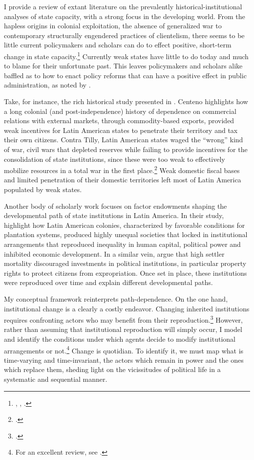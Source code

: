 \documentclass[12pt,]{book}
\let\rmarkdownfootnote\footnote%
\def\footnote{\protect\rmarkdownfootnote}
\begin{document}
I provide a review of extant literature on the prevalently historical-institutional analyses of state capacity, with a strong focus in the developing world. From the hapless origins in colonial exploitation, the absence of generalized war to contemporary structurally engendered practices of clientelism, there seems to be little current policymakers and scholars can do to effect positive, short-term change in state capacity.\footnote{\citet{acemoglu_colonial_2001}, \citet{engerman_factor_1997}, \citet{centeno_blood_1997}.} Currently weak states have little to do today and much to blame for their unfortunate past. This leaves policymakers and scholars alike baffled as to how to enact policy reforms that can have a positive effect in public administration, as noted by \citet{grindle_good_2004}.

Take, for instance, the rich historical study presented in \citet{centeno_blood_1997}. Centeno highlights how a long colonial (and post-independence) history of dependence on commercial relations with external markets, through commodity-based exports, provided weak incentives for Latin American states to penetrate their territory and tax their own citizens. Contra Tilly, Latin American states waged the ``wrong'' kind of war, civil wars that depleted reserves while failing to provide incentives for the consolidation of state institutions, since these were too weak to effectively mobilize resources in a total war in the first place.\footnote{\citet{tilly_coercion_1992}.} Weak domestic fiscal bases and limited penetration of their domestic territories left most of Latin America populated by weak states.

Another body of scholarly work focuses on factor endowments shaping the developmental path of state institutions in Latin America. In their study, \citet{engerman_factor_1997} highlight how Latin American colonies, characterized by favorable conditions for plantation systems, produced highly unequal societies that locked in institutional arrangements that reproduced inequality in human capital, political power and inhibited economic development. In a similar vein, \citet{acemoglu_colonial_2001} argue that high settler mortality discouraged investments in political institutions, in particular property rights to protect citizens from expropriation. Once set in place, these institutions were reproduced over time and explain different developmental paths.

My conceptual framework reinterprets path-dependence. On the one hand, institutional change is a clearly a costly endeavor. Changing inherited institutions requires confronting actors who may benefit from their reproduction.\footnote{\citet{pierson_increasing_2000}.} However, rather than assuming that institutional reproduction will simply occur, I model and identify the conditions under which agents decide to modify institutional arrangements or not.\footnote{For an excellent review, see \citet{thelen_historical_1999}.} Change is quotidian. To identify it, we must map what is time-varying and time-invariant, the actors which remain in power and the ones which replace them, sheding light on the vicissitudes of political life in a systematic and sequential manner.
\end{document}
